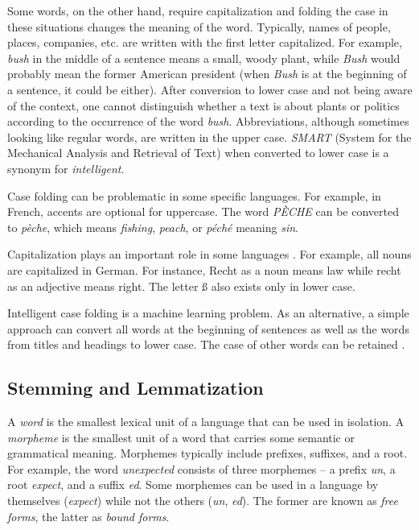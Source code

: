 Some words, on the other hand, require capitalization and folding the case
in these situations changes the meaning of the word. Typically, names of people,
places, companies, etc. are written with the first letter capitalized. For example,
\textit{bush} in the middle of a sentence means a small, woody plant, while 
\textit{Bush} would probably mean the former American president (when 
\textit{Bush} is at the beginning of a sentence, it could be either). After conversion 
to lower case and not being aware of the context, one cannot distinguish whether 
a text is about plants or politics according to the occurrence of the word 
\textit{bush}. Abbreviations, although sometimes looking like regular words, are 
written in the upper case. \textit{SMART} (System for the Mechanical Analysis and 
Retrieval of Text) when converted to lower case is a synonym for \textit{intelligent}.

Case folding can be problematic in some specific languages. For example, in
French, accents are optional for uppercase. The word \textit{P\`ECHE} can be converted
to \textit{p\`eche}, which means \textit{fishing}, \textit{peach}, or \textit{p\'ech\'e} meaning \textit{sin}.

Capitalization plays an important role in some languages \cite{ref102}. For example,
all nouns are capitalized in German. For instance, Recht as a noun means law
while recht as an adjective means right. The letter ß also exists only in lower
case.

Intelligent case folding is a machine learning problem. As an alternative, a
simple approach can convert all words at the beginning of sentences as well as
the words from titles and headings to lower case. The case of other words can be
retained \cite{ref6}.

\subsection{Stemming and Lemmatization}

A \textit{word} is the smallest lexical unit of a language that can be used in isolation.
A \textit{morpheme} is the smallest unit of a word that carries some semantic or grammatical meaning. Morphemes typically include prefixes, suffixes, and a root. For
example, the word \textit{unexpected} consists of three morphemes -- a prefix \textit{un}, 
a root \textit{expect}, and a suffix \textit{ed}. Some morphemes can be used in a language 
by themselves (\textit{expect}) while not the others (\textit{un}, \textit{ed}). The former are 
known as \textit{free forms}, the latter as \textit{bound forms}\cite{ref11}.

